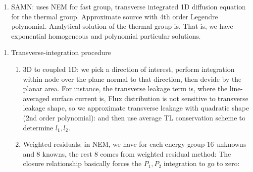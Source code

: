 \documentclass{school-22.211-notes}
\begin{document}
\begin{enumerate}
    \item SAMN: uses NEM for fast group, transverse integrated 1D diffusion equation for the thermal group. Approximate source with 4th order Legendre polynomial. Analytical solution of the thermal group is, 
      That is, we have exponential homogeneous and polynomial particular solutions. 
  \end{enumerate}

\begin{enumerate}
\item Transverse-integration procedure
  \begin{enumerate}
    \item 3D to coupled 1D: we pick a direction of interest, perform integration within node over the plane normal to that direction, then devide by the planar area. For instance, the transverse leakage term is, 
          where the line-averaged surface current is, 
          Flux distribution is not sensitive to transverse leakage shape, so we approximate transverse leakage with quadratic shape (2nd order polynomial): 
          and then use average TL conservation scheme to determine $l_1, l_2$. 
          
    \item Weighted residuals: in NEM, we have for each energy group 16 unknowns and 8 knowns, the rest 8 comes from weighted residual method: 
    The closure relationship basically forces the $P_1, P_2$ integration to go to zero: 
  \end{enumerate}



\end{enumerate}
\end{document}
